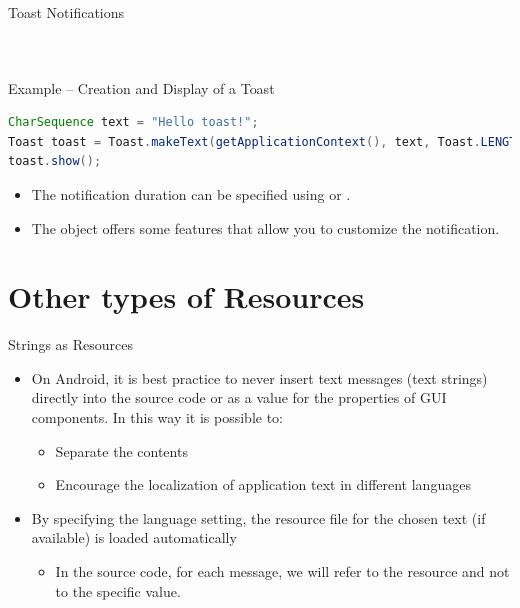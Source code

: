 \documentclass{beamer}
\begin{document}
\begin{frame}{Toast Notifications}
\begin{columns}[t]
\begin{figure}
      \end{figure}
    \end{columns}
    \begin{exampleblock}{Example -- Creation and Display of a Toast}
      \begin{lstlisting}[language=Java]
CharSequence text = "Hello toast!";
Toast toast = Toast.makeText(getApplicationContext(), text, Toast.LENGTH_SHORT);
toast.show();
      \end{lstlisting}
    \end{exampleblock}
    \begin{itemize}\itemsep10pt
      \item The notification duration can be specified using
       or .
      \item The  object offers some features that allow you to
      customize the notification.
    \end{itemize}
  \end{frame}

\section{Other types of Resources}

  \begin{frame}{Strings as Resources}
    \begin{itemize}\itemsep20pt
      \item On Android, it is best practice to never insert text messages (text
      strings) directly into the source code or as a value for the properties of
      GUI components. In this way it is possible to:
      \begin{itemize}
        \item Separate the contents
        \item Encourage the localization of application text in different
        languages
      \end{itemize} 
      \item By specifying the language setting, the resource file for the chosen
      text (if available) is loaded automatically
      \begin{itemize}
        \item In the source code, for each message, we will refer to the
        resource and not to the specific value. 
      \end{itemize}
    \end{itemize}
  \end{frame}
\end{document}
